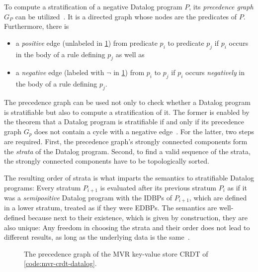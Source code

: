 To compute a stratification of a negative Datalog program \(P\),
its \emph{precedence graph} \(G_P\) can be utilized~\cite{green2013datalog}.
It is a directed graph whose nodes are the predicates of \(P\).
Furthermore, there is

\begin{itemize}
    \item a \emph{positive} edge
          (unlabeled in \ref{fig:precedence-graph-mvr-crdt})
          from predicate \(p_i\) to predicate \(p_j\)
          if \(p_i\) occurs in the body of a rule defining \(p_j\) as well as
    \item a \emph{negative} edge
          (labeled with \(\lnot\) in \ref{fig:precedence-graph-mvr-crdt})
          from \(p_i\) to \(p_j\)
          if \(p_i\) occurs \emph{negatively} in the body of a rule defining \(p_j\).
\end{itemize}

The precedence graph can be used not only to check whether a Datalog
program is stratifiable but also to compute a stratification of it.
The former is enabled by the theorem that a Datalog program is stratifiable
if and only if its precedence graph \(G_p\) does not contain a cycle
with a negative edge~\cite{green2013datalog}.
For the latter, two steps are required.
First, the precedence graph's strongly connected components form the
\emph{strata} of the Datalog program.
Second, to find a valid sequence of the strata,
the strongly connected components have to be topologically sorted.

The resulting order of strata is what imparts the semantics to stratifiable
Datalog programs:
Every stratum \(P_{i+1}\) is evaluated after its previous stratum \(P_{i}\)
as if it was a \emph{semipositive} Datalog program with the \acp{IDBP}
of \(P_{i+1}\), which are defined in a lower stratum,
treated as if they were \acp{EDBP}.
The semantics are well-defined because next to their existence,
which is given by construction, they are also unique: Any freedom
in choosing the strata and their order does not lead to different results,
as long as the underlying data is the same~\cite{apt1988towards}.

\begin{figure}[tpb]
    \centering
    
    \caption{
        The precedence graph of the \ac{MVR} key-value store \ac{CRDT} of \ref{code:mvr-crdt-datalog}.
    }\label{fig:precedence-graph-mvr-crdt}
\end{figure}

